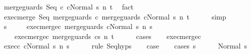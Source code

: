 \begin{isabellebody}
\ {\isachardoublequoteopen}{\isasymGamma}{\isasymturnstile}{\isasymlangle}merge{\isacharunderscore}guards\ {\isacharparenleft}Seq\ c{}\ c{}{\isacharparenright}{\isacharcomma}Normal\ s{\isasymrangle}\ {\isacharequal}n{\isasymRightarrow}\ t{\isachardoublequoteclose}\ \isamarkupfalse%
\ fact\isanewline
\ \ \isamarkupfalse%
\ exec{\isacharunderscore}merge{\isacharcolon}\ {\isachardoublequoteopen}{\isasymGamma}{\isasymturnstile}{\isasymlangle}Seq\ {\isacharparenleft}merge{\isacharunderscore}guards\ c{}{\isacharparenright}\ {\isacharparenleft}merge{\isacharunderscore}guards\ c{}{\isacharparenright}{\isacharcomma}Normal\ s{\isasymrangle}\ {\isacharequal}n{\isasymRightarrow}\ t{\isachardoublequoteclose}\isanewline
\ \ \ \ \isamarkupfalse%
\ simp\isanewline
\ \ \isamarkupfalse%
\ \isamarkupfalse%
\ s{\isacharprime}\ \isanewline
\ \ \ \ exec{\isacharunderscore}merge{\isacharunderscore}c{}{\isacharcolon}\ {\isachardoublequoteopen}{\isasymGamma}{\isasymturnstile}{\isasymlangle}merge{\isacharunderscore}guards\ c{}{\isacharcomma}Normal\ s{\isasymrangle}\ {\isacharequal}n{\isasymRightarrow}\ s{\isacharprime}{\isachardoublequoteclose}\ \isanewline
\ \ \ \ exec{\isacharunderscore}merge{\isacharunderscore}c{}{\isacharcolon}\ {\isachardoublequoteopen}{\isasymGamma}{\isasymturnstile}{\isasymlangle}merge{\isacharunderscore}guards\ c{}{\isacharcomma}s{\isacharprime}{\isasymrangle}\ {\isacharequal}n{\isasymRightarrow}\ t{\isachardoublequoteclose}\isanewline
\ \ \ \ \isamarkupfalse%
\ cases\isanewline
\ \ \isamarkupfalse%
\ exec{\isacharunderscore}merge{\isacharunderscore}c{}\isanewline
\ \ \isamarkupfalse%
\ exec{\isacharunderscore}c{}{\isacharcolon}\ {\isachardoublequoteopen}{\isasymGamma}{\isasymturnstile}{\isasymlangle}c{}{\isacharcomma}Normal\ s{\isasymrangle}\ {\isacharequal}n{\isasymRightarrow}\ s{\isacharprime}{\isachardoublequoteclose}\isanewline
\ \ \ \ \isamarkupfalse%
\ {\isacharparenleft}rule\ Seq{\isachardot}hyps{\isacharparenright}\isanewline
\ \ \isamarkupfalse%
\ {\isacharquery}case\isanewline
\ \ \isamarkupfalse%
\ {\isacharparenleft}cases\ s{\isacharprime}{\isacharparenright}\isanewline
\ \ \ \ \isamarkupfalse%
\ {\isacharparenleft}Normal\ s{\isacharprime}{\isacharprime}{\isacharparenright}\isanewline

\end{isabellebody}
